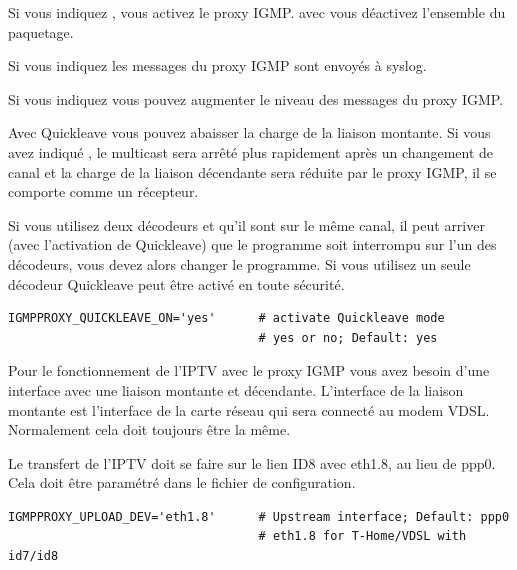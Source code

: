 \begin{description}


Si vous indiquez , vous activez le proxy IGMP. avec  vous déactivez
l'ensemble du paquetage.


Si vous indiquez  les messages du proxy IGMP sont envoyés à syslog.


Si vous indiquez  vous pouvez augmenter le niveau des messages du proxy IGMP.


Avec Quickleave vous pouvez abaisser la charge de la liaison montante. Si vous avez indiqué
, le multicast sera arrêté plus rapidement après un changement de canal et la charge
de la liaison décendante sera réduite par le proxy IGMP, il se comporte comme un récepteur.

Si vous utilisez deux décodeurs et qu'il sont sur le même canal, il peut arriver (avec
l'activation de Quickleave) que le programme soit interrompu sur l'un des décodeurs, vous
devez alors changer le programme. Si vous utilisez un seule décodeur Quickleave peut être
activé en toute sécurité.

\begin{example}
\begin{verbatim}
IGMPPROXY_QUICKLEAVE_ON='yes'      # activate Quickleave mode
                                   # yes or no; Default: yes
\end{verbatim}
\end{example}


Pour le fonctionnement de l'IPTV avec le proxy IGMP vous avez besoin d'une interface avec
une liaison montante et décendante. L'interface de la liaison montante est l'interface de
la carte réseau qui sera connecté au modem VDSL. Normalement cela doit toujours être la même.

Le transfert de l'IPTV doit se faire sur le lien ID8 avec eth1.8, au lieu de ppp0. Cela doit
être paramétré dans le fichier de configuration.

\begin{example}
\begin{verbatim}
IGMPPROXY_UPLOAD_DEV='eth1.8'      # Upstream interface; Default: ppp0
                                   # eth1.8 for T-Home/VDSL with id7/id8
\end{verbatim}
\end{example}


\end{description}
